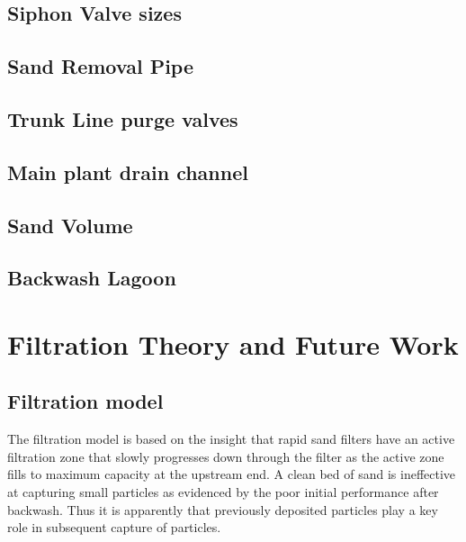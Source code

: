 \documentclass[letterpaper,10pt,english]{sphinxmanual}
\begin{document}
\section{Siphon Valve sizes}
\label{\detokenize{Filtration/Filtration_Derivations:siphon-valve-sizes}}

\section{Sand Removal Pipe}
\label{\detokenize{Filtration/Filtration_Derivations:sand-removal-pipe}}

\section{Trunk Line purge valves}
\label{\detokenize{Filtration/Filtration_Derivations:trunk-line-purge-valves}}

\section{Main plant drain channel}
\label{\detokenize{Filtration/Filtration_Derivations:main-plant-drain-channel}}

\section{Sand Volume}
\label{\detokenize{Filtration/Filtration_Derivations:sand-volume}}

\section{Backwash Lagoon}
\label{\detokenize{Filtration/Filtration_Derivations:backwash-lagoon}}

\chapter{Filtration Theory and Future Work}
\label{\detokenize{Filtration/Filtration_Theory_and_Future_Work:filtration-theory-and-future-work}}\label{\detokenize{Filtration/Filtration_Theory_and_Future_Work:title-filtration-theory-and-future-work}}\label{\detokenize{Filtration/Filtration_Theory_and_Future_Work::doc}}

\section{Filtration model}
\label{\detokenize{Filtration/Filtration_Theory_and_Future_Work:filtration-model}}
The filtration model is based on the insight that rapid sand filters have an active filtration zone that slowly progresses down through the filter as the active zone fills to maximum capacity at the upstream end. A clean bed of sand is ineffective at capturing small particles as evidenced by the poor initial performance after backwash. Thus it is apparently that previously deposited particles play a key role in subsequent capture of particles.
\end{document}
